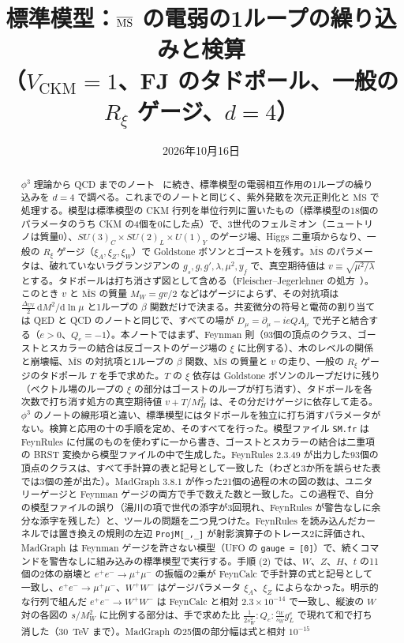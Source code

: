 \documentclass[a4paper,10pt]{ltjsarticle}
\title{標準模型：$\MSbar$ の電弱の1ループの繰り込みと検算\\（$V_{\mathrm{CKM}}=1$、FJ のタドポール、一般の $R_\xi$ ゲージ、$d=4$）}
\author{}
\date{2026年10月16日}
\newcommand{\dd}{\mathrm{d}}
\newcommand{\MSbar}{\overline{\mathrm{MS}}}
\newcommand{\DUV}{\Delta_{\mathrm{UV}}}
\newcommand{\sw}{s_W}
\newcommand{\cw}{c_W}
\begin{document}
\maketitle

\begin{abstract}
$\phi^3$ 理論から QCD までのノート~\cite{phi3note,phi34note,yukawanote,qednote,qcdnote} に続き、標準模型の電弱相互作用の1ループの繰り込みを $d=4$ で調べる。これまでのノートと同じく、紫外発散を次元正則化と $\MSbar$ で処理する。模型は標準模型の CKM 行列を単位行列に置いたもの（標準模型の18個のパラメータのうち CKM の4個を0にした点）で、3世代のフェルミオン（ニュートリノは質量0）、$SU(3)_C\times SU(2)_L\times U(1)_Y$ のゲージ場、Higgs 二重項からなり、一般の $R_\xi$ ゲージ（$\xi_A,\xi_Z,\xi_W$）で Goldstone ボソンとゴーストを残す。$\MSbar$ のパラメータは、破れていないラグランジアンの $g_s,g,g',\lambda,\mu^2,y_f$ で、真空期待値は $v\equiv\sqrt{\mu^2/\lambda}$ とする。タドポールは打ち消さず図として含める（Fleischer--Jegerlehner の処方~\cite{fj81}）。このとき $v$ と $\MSbar$ の質量 $M_W=gv/2$ などはゲージによらず、その対抗項は $\frac{\DUV}2\,\dd M^2/\dd\ln\mu$ と1ループの $\beta$ 関数だけで決まる。共変微分の符号と電荷の割り当ては QED と QCD のノートと同じで、すべての場が $D_\mu=\partial_\mu-ieQA_\mu$ で光子と結合する（$e>0$、$Q_e=-1$）。本ノートではまず、Feynman 則（93個の頂点のクラス、ゴーストとスカラーの結合は反ゴーストのゲージ場の $\xi$ に比例する）、木のレベルの関係と崩壊幅、$\MSbar$ の対抗項と1ループの $\beta$ 関数、$\MSbar$ の質量と $v$ の走り、一般の $R_\xi$ ゲージのタドポール $T$ を手で求めた。$T$ の $\xi$ 依存は Goldstone ボソンのループだけに残り（ベクトル場のループの $\xi$ の部分はゴーストのループが打ち消す）、タドポールを各次数で打ち消す処方の真空期待値 $v+T/M_H^2$ は、その分だけゲージに依存して走る。$\phi^3$ のノートの線形項と違い、標準模型にはタドポールを独立に打ち消すパラメータがない。検算と応用の十の手順を定め、そのすべてを行った。模型ファイル \texttt{SM.fr} は FeynRules に付属のものを使わずに一から書き、ゴーストとスカラーの結合は二重項の BRST 変換から模型ファイルの中で生成した。FeynRules 2.3.49 が出力した93個の頂点のクラスは、すべて手計算の表と記号として一致した（わざと3か所を誤らせた表では3個の差が出た）。MadGraph 3.8.1 が作った21個の過程の木の図の数は、ユニタリーゲージと Feynman ゲージの両方で手で数えた数と一致した。この過程で、自分の模型ファイルの誤り（湯川の項で世代の添字が3回現れ、FeynRules が警告なしに余分な添字を残した）と、ツールの問題を二つ見つけた。FeynRules を読み込んだカーネルでは置き換えの規則の左辺 \texttt{ProjM[\_,\_]} が射影演算子のトレース2に評価され、MadGraph は Feynman ゲージを許さない模型（UFO の \texttt{gauge = [0]}）で、続くコマンドを警告なしに組み込みの標準模型で実行する。手順 (2) では、$W$、$Z$、$H$、$t$ の11個の2体の崩壊と $e^+e^-\to\mu^+\mu^-$ の振幅の2乗が FeynCalc で手計算の式と記号として一致し、$e^+e^-\to\mu^+\mu^-$、$W^+W^-$ はゲージパラメータ $\xi_A$、$\xi_Z$ によらなかった。明示的な行列で組んだ $e^+e^-\to W^+W^-$ は FeynCalc と相対 $2.3\times10^{-14}$ で一致し、縦波の $W$ 対の各図の $s/M_W^2$ に比例する部分は、手で求めた比 $\frac1{2\sw^2}:Q_e:\frac{\cw}{\sw}g_L^e$ で現れて和で打ち消した（30~TeV まで）。MadGraph の25個の部分幅は式と相対 $10^{-15}$ 
\end{abstract}
\end{document}
